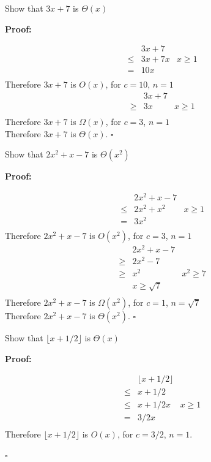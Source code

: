 \documentclass{article}
\newenvironment{proof}
{\color{PineGreen}\begin{list}{}%
         {\setlength{\leftmargin}{1cm}}%
         \item[]%
        \textbf{Proof:}
        
        }
{ $\square$\end{list}}
\begin{document}
\begin{enumerate}[label=\alph{enumi})]
\item Show that $3x + 7$ is $\Theta (x)$
\begin{proof}
\[\begin{array}{rclr}
&&3x+7&\\
&\leq&3x+7x	&	x\geq 1\\
&=&10x & \\
\end{array}\]
Therefore $3x+7$ is $O(x)$, for $c=10$, $n=1$
\[\begin{array}{rclr}
&&3x+7&\\
&\geq&3x	&	x\geq 1\\
\end{array}\]
Therefore $3x+7$ is $\Omega(x)$, for $c=3$, $n=1$\\
Therefore $3x+7$ is $\Theta (x)$.
\end{proof}
\item Show that $2x^2+x-7$ is $\Theta (x^2)$
\begin{proof}
\[\begin{array}{rclr}
&&2x^2+x-7&\\
&\leq&2x^2+x^2	&	x\geq 1\\
&=&3x^2 & \\
\end{array}\]
Therefore $2x^2+x-7$ is $O(x^2)$, for $c=3$, $n=1$
\[\begin{array}{rclr}
&&2x^2+x-7&\\
&\geq&2x^2-7	&	\\
&\geq&x^2		& x^2 \geq 7 \\
&				& x \geq \sqrt{7} \\
\end{array}\]
Therefore $2x^2+x-7$ is $\Omega(x^2)$, for $c=1$, $n=\sqrt{7}$\\
Therefore $2x^2+x-7$ is $\Theta (x^2)$.
\end{proof}
\item Show that $\lfloor x + 1/2 \rfloor$ is $\Theta (x)$
\begin{proof}
\[\begin{array}{rclr}
&&\lfloor x + 1/2 \rfloor&\\
&\leq&x + 1/2	&		\\
&\leq&x + 1/2x	&	x \geq 1	\\
&=&3/2x			& \\
\end{array}\]
Therefore $\lfloor x + 1/2 \rfloor$ is $O(x)$, for $c=3/2$, $n=1$.


\end{proof}
\end{enumerate}
\end{document}

